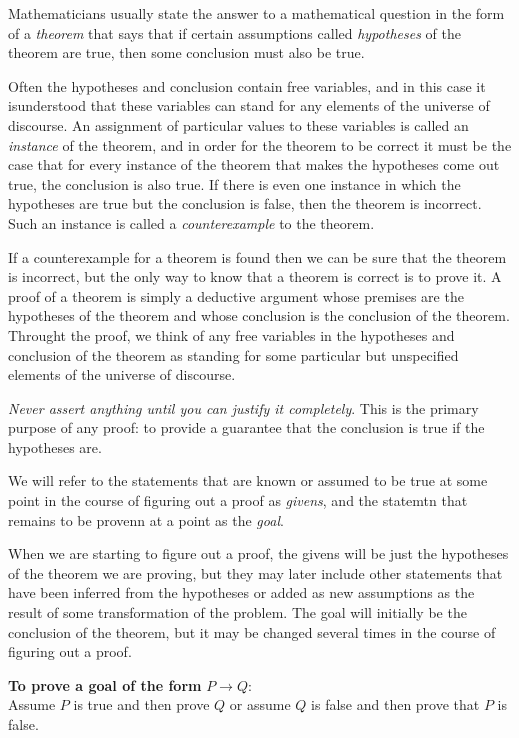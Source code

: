Mathematicians usually state the answer to a mathematical question in the form of a \textit{theorem} that says that if certain assumptions called \textit{hypotheses} of the theorem are true, then some conclusion must also be true.

Often the hypotheses and conclusion contain free variables, and in this case it isunderstood that these variables can stand for any elements of the universe of discourse. An assignment of particular values to these variables is called an \textit{instance} of the theorem, and in order for the theorem to be correct it must be the case that for every instance of the theorem that makes the hypotheses come out true, the conclusion is also true. If there is even one instance in which the hypotheses are true but the conclusion is false, then the theorem is incorrect. Such an instance is called a \textit{counterexample} to the theorem.

If a counterexample for a theorem is found then we can be sure that the theorem is incorrect, but the only way to know that a theorem is correct is to prove it. A proof of a theorem is simply a deductive argument whose premises are the hypotheses of the theorem and whose conclusion is the conclusion of the theorem. Throught the proof, we think of any free variables in the hypotheses and conclusion of the theorem as standing for some particular but unspecified elements of the universe of discourse.

\textit{Never assert anything until you can justify it completely}. This is the primary purpose of any proof: to provide a guarantee that the conclusion is true if the hypotheses are.

We will refer to the statements that are known or assumed to be true at some point in the course of figuring out a proof as \textit{givens}, and the statemtn that remains to be provenn at a point as the \textit{goal}. 

When we are starting to figure out a proof, the givens will be just the hypotheses of the theorem we are proving, but they may later include other statements that have been inferred from the hypotheses or added as new assumptions as the result of some transformation of the problem. The goal will initially be the conclusion of the theorem, but it may be changed several times in the course of figuring out a proof.

\textbf{To prove a goal of the form} $P \rightarrow Q$:\\
Assume $P$ is true and then prove $Q$ or assume $Q$ is false and then prove that $P$ is false.